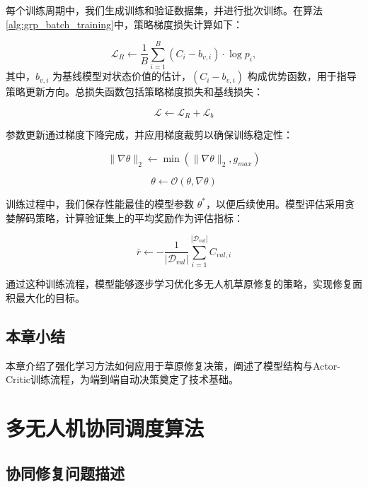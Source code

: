 \documentclass[AutoFakeBold]{LZUThesis}
\begin{document}
每个训练周期中，我们生成训练和验证数据集，并进行批次训练。在算法\ref{alg:grp_batch_training}中，策略梯度损失计算如下：

\begin{equation}
	\mathcal{L}_{R} \leftarrow \frac{1}{B}\sum_{i=1}^{B}(C_i - b_{v,i}) \cdot \log p_i,
\end{equation}
其中，$b_{v,i}$ 为基线模型对状态价值的估计，$(C_i - b_{v,i})$ 构成优势函数，用于指导策略更新方向。总损失函数包括策略梯度损失和基线损失：

\begin{equation}
	\mathcal{L} \leftarrow \mathcal{L}_{R} + \mathcal{L}_{b}
\end{equation}

参数更新通过梯度下降完成，并应用梯度裁剪以确保训练稳定性：

\begin{equation}
	\|\nabla\theta\|_2 \leftarrow \min(\|\nabla\theta\|_2, g_{max})
\end{equation}

\begin{equation}
	\theta \leftarrow \mathcal{O}(\theta, \nabla\theta)
\end{equation}

训练过程中，我们保存性能最佳的模型参数 $\theta^*$，以便后续使用。模型评估采用贪婪解码策略，计算验证集上的平均奖励作为评估指标：

\begin{equation}
	\bar{r} \leftarrow -\frac{1}{|\mathcal{D}_{val}|}\sum_{i=1}^{|\mathcal{D}_{val}|} C_{val,i}
\end{equation}

通过这种训练流程，模型能够逐步学习优化多无人机草原修复的策略，实现修复面积最大化的目标。

\section{本章小结}
本章介绍了强化学习方法如何应用于草原修复决策，阐述了模型结构与Actor-Critic训练流程，为端到端自动决策奠定了技术基础。

\chapter{多无人机协同调度算法}

\section{协同修复问题描述}
\end{document}
